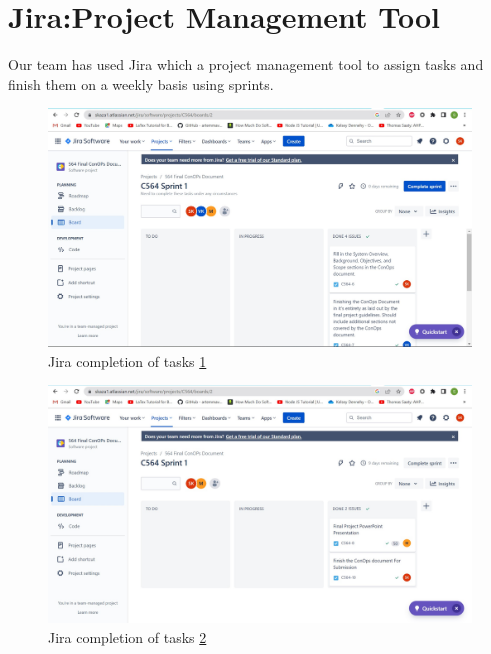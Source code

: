     
\section{ Jira:Project Management Tool \cite{jira} \label{Section::Jira Project Management Tool} }
Our team has used Jira which a project management tool to assign tasks and finish them on a weekly basis using sprints. 

\begin{figure}[H]
    \centering
    \includegraphics[scale=0.43]{Figures/Jira all completed tasks.jpg}
    \caption{ Jira completion of tasks \ref{fig::Jira all completed tasks}}
    \label{fig::Jira all completed tasks}
\end{figure}


\begin{figure}[H]
    \centering
    \includegraphics[scale=0.43]{Figures/All tasks completed.jpg}
    \caption{ Jira completion of tasks \ref{fig::All tasks completed.jpg}}
    \label{fig::All tasks completed.jpg}
\end{figure}



